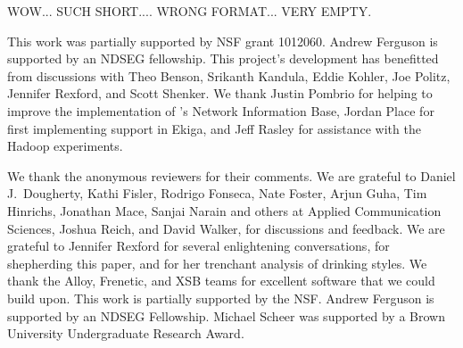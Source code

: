 

{\color{blue} WOW... SUCH SHORT.... WRONG FORMAT... VERY EMPTY.}

This work was partially supported by NSF grant 1012060.
Andrew Ferguson is supported by an NDSEG fellowship.
This project's development has benefitted from discussions with Theo Benson,
Srikanth Kandula, Eddie Kohler, Joe Politz, Jennifer Rexford, and Scott Shenker.
We thank Justin Pombrio for helping to improve the implementation of \sys's
Network Information Base, Jordan Place for first implementing \sys support
in Ekiga, and Jeff Rasley for assistance with the Hadoop experiments.

We thank the anonymous reviewers for their comments. We are grateful to
Daniel J.\ Dougherty, Kathi Fisler, Rodrigo Fonseca, Nate Foster, Arjun Guha, 
Tim Hinrichs, Jonathan Mace, Sanjai Narain and others at Applied
Communication Sciences, Joshua Reich, and David Walker, for
discussions and feedback. We are grateful to Jennifer Rexford for several
enlightening conversations, for shepherding this paper, and for her
trenchant analysis of drinking styles.
We thank the Alloy, Frenetic, and XSB teams for excellent software that we
could build upon. This work is
partially supported by the NSF. Andrew Ferguson is supported by an NDSEG
Fellowship. Michael Scheer was supported by a Brown University
Undergraduate Research Award.